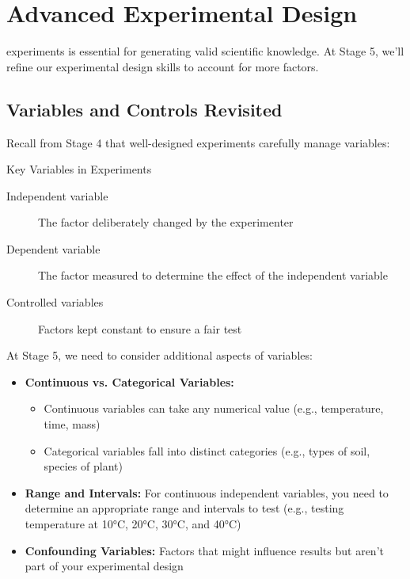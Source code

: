 \section{Advanced Experimental Design}

 experiments is essential for generating valid scientific knowledge. At Stage 5, we'll refine our experimental design skills to account for more factors.

\subsection{Variables and Controls Revisited}

Recall from Stage 4 that well-designed experiments carefully manage variables:

\begin{keyconcept}{Key Variables in Experiments}
\begin{description}
    \item[Independent variable] The factor deliberately changed by the experimenter
    \item[Dependent variable] The factor measured to determine the effect of the independent variable
    \item[Controlled variables] Factors kept constant to ensure a fair test
\end{description}
\end{keyconcept}

At Stage 5, we need to consider additional aspects of variables:

\begin{itemize}
    \item \textbf{Continuous vs. Categorical Variables:} 
    \begin{itemize}
        \item Continuous variables can take any numerical value (e.g., temperature, time, mass)
        \item Categorical variables fall into distinct categories (e.g., types of soil, species of plant)
    \end{itemize}
    
    \item \textbf{Range and Intervals:} For continuous independent variables, you need to determine an appropriate range and intervals to test (e.g., testing temperature at 10°C, 20°C, 30°C, and 40°C)
    
    \item \textbf{Confounding Variables:} Factors that might influence results but aren't part of your experimental design
\end{itemize}

